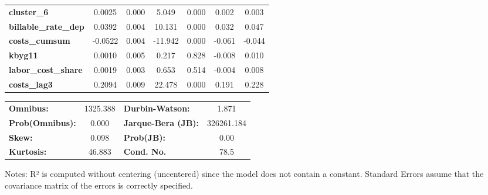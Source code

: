 \begin{center}
\begin{tabular}{lcccccc}
\textbf{cluster\_6}                       &       0.0025  &        0.000     &     5.049  &         0.000        &        0.002    &        0.003     \\
\textbf{billable\_rate\_dep}              &       0.0392  &        0.004     &    10.131  &         0.000        &        0.032    &        0.047     \\
\textbf{costs\_cumsum}                    &      -0.0522  &        0.004     &   -11.942  &         0.000        &       -0.061    &       -0.044     \\
\textbf{kbyg11}                           &       0.0010  &        0.005     &     0.217  &         0.828        &       -0.008    &        0.010     \\
\textbf{labor\_cost\_share}               &       0.0019  &        0.003     &     0.653  &         0.514        &       -0.004    &        0.008     \\
\textbf{costs\_lag3}                      &       0.2094  &        0.009     &    22.478  &         0.000        &        0.191    &        0.228     \\
\bottomrule
\end{tabular}
\begin{tabular}{lclc}
\textbf{Omnibus:}       & 1325.388 & \textbf{  Durbin-Watson:     } &     1.871   \\
\textbf{Prob(Omnibus):} &   0.000  & \textbf{  Jarque-Bera (JB):  } & 326261.184  \\
\textbf{Skew:}          &   0.098  & \textbf{  Prob(JB):          } &      0.00   \\
\textbf{Kurtosis:}      &  46.883  & \textbf{  Cond. No.          } &      78.5   \\
\bottomrule
\end{tabular}
\end{center}

Notes: \newline
 [1] R² is computed without centering (uncentered) since the model does not contain a constant. \newline
 [2] Standard Errors assume that the covariance matrix of the errors is correctly specified.